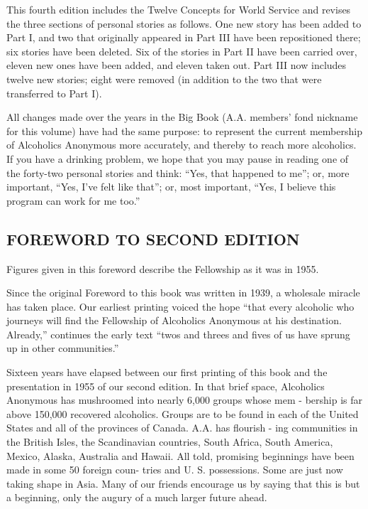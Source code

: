 This fourth edition includes the Twelve Concepts for World Service and revises the three sections of personal stories as follows.
One new story has been added to Part I, and two that originally appeared in Part III have been repositioned there; 
six stories have been deleted.
Six of the stories in Part II have been carried over, eleven new ones have been added, and eleven taken out.
Part III now includes twelve new stories; 
eight were removed (in addition to the two that were transferred to Part I).

All changes made over the years in the Big Book (A.A. members’ fond nickname for this volume) have had the same purpose: 
to represent the current membership of Alcoholics Anonymous more accurately, and thereby to reach more alcoholics.
If you have a drinking problem, we hope that you may pause in reading one of the forty-two personal stories and think: 
“Yes, that happened to me”; 
or, more important, “Yes, I’ve felt like that”; 
or, most important, “Yes, I believe this program can work for me too.”



\subsection{FOREWORD TO SECOND EDITION}

Figures given in this foreword describe the
Fellowship as it was in 1955.

Since the original Foreword to this book was
written in 1939, a wholesale miracle has taken
place. Our earliest printing voiced the hope “that
every alcoholic who journeys will ﬁnd the Fellowship
of Alcoholics Anonymous at his destination. Already,”
continues the early text “twos and threes and ﬁves of
us have sprung up in other communities.”

Sixteen years have elapsed between our ﬁrst printing
of this book and the presentation in 1955 of our second
edition. In that brief space, Alcoholics Anonymous
has mushroomed into nearly 6,000 groups whose mem -
bership is far above 150,000 recovered alcoholics.
Groups are to be found in each of the United States
and all of the provinces of Canada. A.A. has ﬂourish -
ing communities in the British Isles, the Scandinavian
countries, South Africa, South America, Mexico,
Alaska, Australia and Hawaii. All told, promising
beginnings have been made in some 50 foreign coun-
tries and U. S. possessions. Some are just now taking
shape in Asia. Many of our friends encourage us by
 saying that this is but a beginning, only the augury of
a much larger future ahead.

